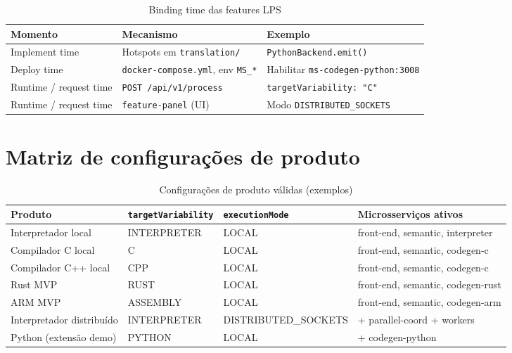 \documentclass[12pt]{article}
\begin{document}
\begin{table}[htbp]
\centering
\small
\caption{Binding time das features LPS}
\label{tab:binding-time}
\begin{tabularx}{\textwidth}{|l|Y|Y|}
\hline
\textbf{Momento} & \textbf{Mecanismo} & \textbf{Exemplo} \\
\hline
Implement time & Hotspots em \texttt{translation/} & \texttt{PythonBackend.emit()} \\
Deploy time & \texttt{docker-compose.yml}, env \texttt{MS\_*} & Habilitar \texttt{ms-codegen-python:3008} \\
Runtime / request time & \texttt{POST /api/v1/process} & \texttt{targetVariability: "C"} \\
Runtime / request time & \texttt{feature-panel} (UI) & Modo \texttt{DISTRIBUTED\_SOCKETS} \\
\hline
\end{tabularx}
\end{table}

\section{Matriz de configurações de produto}

\begin{table}[htbp]
\centering
\small
\caption{Configurações de produto válidas (exemplos)}
\label{tab:product-config}
\begin{tabularx}{\textwidth}{|Y|l|l|Y|}
\hline
\textbf{Produto} & \texttt{targetVariability} & \texttt{executionMode} & \textbf{Microsserviços ativos} \\
\hline
Interpretador local & INTERPRETER & LOCAL & front-end, semantic, interpreter \\
Compilador C local & C & LOCAL & front-end, semantic, codegen-c \\
Compilador C++ local & CPP & LOCAL & front-end, semantic, codegen-c \\
Rust MVP & RUST & LOCAL & front-end, semantic, codegen-rust \\
ARM MVP & ASSEMBLY & LOCAL & front-end, semantic, codegen-arm \\
Interpretador distribuído & INTERPRETER & DISTRIBUTED\_SOCKETS & + parallel-coord + workers \\
Python (extensão demo) & PYTHON & LOCAL & + codegen-python \\
\hline
\end{tabularx}
\end{table}
\end{document}
